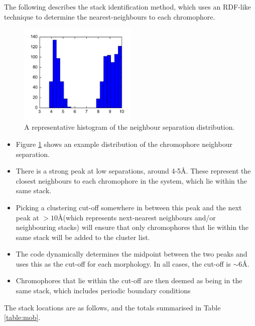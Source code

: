 \documentclass[12pt]{article}
\begin{document}
The following describes the stack identification method, which uses an RDF-like technique to determine the nearest-neighbours to each chromophore.

\begin{figure}[h!]\centering
	\includegraphics[width=0.5\textwidth]{Figures/neighbourHist.pdf}
    \caption{A representative histogram of the neighbour separation distribution.}
	\label{fig:neighbourHist}
\end{figure}

\begin{itemize}
    \item{Figure \ref{fig:neighbourHist} shows an example distribution of the chromophore neighbour separation.}
    \item{There is a strong peak at low separations, around 4-5\AA. These represent the closest neighbours to each chromophore in the system, which lie within the same stack.}
    \item{Picking a clustering cut-off somewhere in between this peak and the next peak at $> 10$\AA (which represents next-nearest neighbours and/or neighbouring stacks) will ensure that only chromophores that lie within the same stack will be added to the cluster list.}
    \item{The code dynamically determines the midpoint between the two peaks and uses this as the cut-off for each morphology. In all cases, the cut-off is $\sim 6$\AA.}
    \item{Chromophores that lie within the cut-off are then deemed as being in the same stack, which includes periodic boundary conditions}
\end{itemize}


The stack locations are as follows, and the totals summarised in Table \ref{table:mob}.
\end{document}
